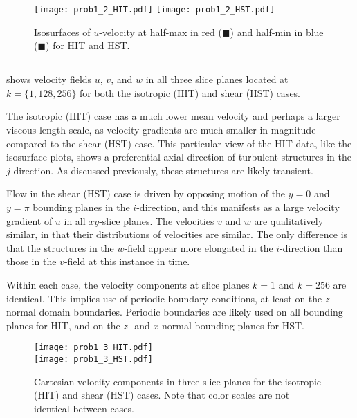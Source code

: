 \documentclass[11pt]{article}
\begin{document}
\begin{figure}[t]
\centering
\texttt{[image: prob1\_2\_HIT.pdf]}
\texttt{[image: prob1\_2\_HST.pdf]}
\vspace{6pt}
\caption{Isosurfaces of $u$-velocity at half-max in red ({\color{red}$\blacksquare$}) and half-min in blue ({\color{blue}$\blacksquare$}) for HIT and HST.}
\label{fig:prob_1_2_isosurfaces}
\end{figure}

\subsection{}

 shows velocity fields $u$, $v$, and $w$ in all three slice planes located at $k = \{1, 128, 256\}$ for both the isotropic (HIT) and shear (HST) cases.

The isotropic (HIT) case has a much lower mean velocity and perhaps a larger viscous length scale, as velocity gradients are much smaller in magnitude compared to the shear (HST) case. This particular view of the HIT data, like the isosurface plots, shows a preferential axial direction of turbulent structures in the $j$-direction. As discussed previously, these structures are likely transient.

Flow in the shear (HST) case is driven by opposing motion of the $y=0$ and $y=\pi$ bounding planes in the $i$-direction, and this manifests as a large velocity gradient of $u$ in all $xy$-slice planes. The velocities $v$ and $w$ are qualitatively similar, in that their distributions of velocities are similar. The only difference is that the structures in the $w$-field appear more elongated in the $i$-direction than those in the $v$-field at this instance in time.

Within each case, the velocity components at slice planes $k=1$ and $k=256$ are identical. This implies use of periodic boundary conditions, at least on the $z$-normal domain boundaries. Periodic boundaries are likely used on all bounding planes for HIT, and on the $z$- and $x$-normal bounding planes for HST.

\begin{figure}[h!]
\centering
\texttt{[image: prob1\_3\_HIT.pdf]}
\\
\texttt{[image: prob1\_3\_HST.pdf]}
\\[6pt]
\caption{Cartesian velocity components in three slice planes for the isotropic (HIT) and shear (HST) cases. Note that color scales are not identical between cases.}
\label{fig:prob_1_3_slices}
\end{figure}
\end{document}
